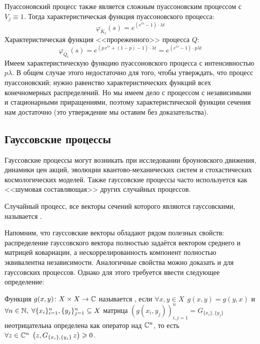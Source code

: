 \begin{solution}
    Пуассоновский процесс также является сложным пуассоновским процессом с $ V_j \equiv 1 $.
    Тогда характеристическая функция пуассоновского процесса:
    \[
        \varphi_{K_t}(s) = e^{\left(e^{i s} - 1 \right) \cdot \lambda t}
    \]
    Характеристическая функция <<прореженного>> процесса $ Q $:
    \[
        \varphi_{Q_t}(s) = e^{\left(p \, e^{i s} + (1 - p) - 1 \right) \cdot \lambda t} = e^{\left(e^{i s} - 1 \right) \cdot p \lambda t}
    \]
    Имеем характеристическую функцию пуассоновского процесса с интенсивностью $ p \lambda $.
    В общем случае этого недостаточно для того, чтобы утверждать, что процесс пуассоновский;
    нужно равенство характеристических функций всех конечномерных распределений.
    Но мы имеем дело с процессом с независимыми и стационарными приращениями,
    поэтому характеристической функции сечения нам достаточно
    (это утверждение мы оставим без доказательства).
\end{solution}




\subsection{Гауссовские процессы} \label{subsection:special:gaussian}

Гауссовские процессы могут возникать при исследовании броуновского движения,
динамики цен акций, эволюции квантово-механических систем и стохастических космологических моделей.
Также гауссовские процессы часто используется как <<шумовая составляющая>> других случайных процессов.

\begin{definition}
    \label{definition:special:gaussian_process}
    Случайный процесс, все векторы сечений которого являются гауссовскими,
    называется .
\end{definition}

Напомним, что гауссовские векторы обладают рядом полезных свойств:
распределение гауссовского вектора полностью задаётся вектором среднего и матрицей ковариации,
а нескоррелированность компонент полностью эквивалентна независимости.
Аналогичные свойства можно доказать и для гауссовских процессов.
Однако для этого требуется ввести следующее определение:

\begin{definition}
    \label{definition:special:positive_semi_definite_function}
    Функция $ g(x, y) \colon X \times X \to \mathbb{C} $ называется ,
    если $ \forall x, y \in X \;\, g(x, y) = g(y, x) $ и $ \forall n \in \mathbb{N}, \; \forall \{x_i\}_{i=1}^n, \{y_j\}_{j=1}^n \subseteq X $
    матрица $ (g(x_i, y_j))_{i,j=1}^n = G_{\{x_i\}, \{y_j\}} $ неотрицательна определена как оператор над $ \mathbb{C}^n $,
    то есть $ \forall z \in \mathbb{C}^n \; \left(z, G_{\{x_i\}, \{y_j\}} \, z\right) \geqslant 0 $.
\end{definition}


